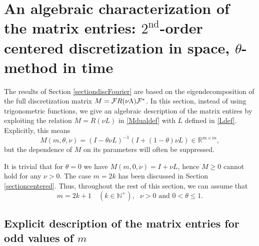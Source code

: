 \documentclass[a4paper]{article}
\newtheorem{remark}{Remark}
\newcommand{\te}{\theta}
\newcommand{\nplus}{\mathbb{N}^+}
\newcommand{\cF}{{\cal{F}}}
\begin{document}
\section{An algebraic characterization of the matrix entries: $2^\text{nd}$-order centered discretization in space, $\theta$-method in time}\label{section3}

The results of Section \ref{sectiondiscFourier} are based on the eigendecomposition of the full discretization matrix $M=\cF R(\nu \Lambda) \cF^*$. In this section, instead of using trigonometric functions, we give an algebraic description of the matrix entires by exploiting the relation $M=R(\nu L)$ in \eqref{Mdualdef} with $L$ defined in \eqref{Ldef}.
Explicitly, this means 
\begin{equation}\label{Mdef}
M(m,\te,\nu)=(I-\te\nu L)^{-1}(I+(1-\te)\nu L)\in\mathbb{R}^{m\times m},
\end{equation}
but the dependence of $M$ on its parameters will often be suppressed. 

It is trivial that for $\te=0$ we have $M(m,0,\nu)=I+\nu L$, hence $M\ge 0$ cannot hold for any $\nu>0$. The case $m=2k$ has been discussed in Section \ref{sectioncentered}. Thus, throughout the rest of this section, we can assume that 
\begin{equation}\label{genassump}
\boxed{ 
m=2k+1\quad (k\in\nplus), \ \ \ \nu>0 \text{\ \  and\ \  } 0<\te\le 1.}
\end{equation}

\subsection{Explicit description of the matrix entries for odd values of $m$}\label{explsect}

\end{document}
